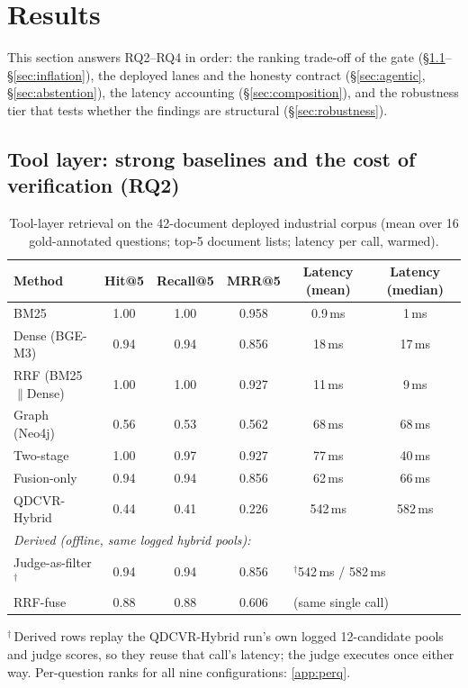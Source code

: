 \section{Results}
\label{sec:results}

This section answers RQ2--RQ4 in order: the ranking trade-off of the gate
(\S\ref{sec:retrieval}--\S\ref{sec:inflation}), the deployed lanes and the
honesty contract (\S\ref{sec:agentic}, \S\ref{sec:abstention}), the latency
accounting (\S\ref{sec:composition}), and the robustness tier that tests
whether the findings are structural (\S\ref{sec:robustness}).

\subsection{Tool layer: strong baselines and the cost of verification (RQ2)}
\label{sec:retrieval}

\begin{table}[!htbp]
\centering
\footnotesize
\setlength{\tabcolsep}{3pt}
\caption{Tool-layer retrieval on the 42-document deployed industrial corpus
(mean
over 16 gold-annotated questions; top-5 document lists; latency per call,
warmed).}
\label{tab:retrieval}
\begin{tabular}{lccccc}
\toprule
Method & Hit@5 & Recall@5 & MRR@5 & Latency (mean) & Latency (median) \\
\midrule
BM25                  & 1.00 & 1.00 & 0.958 & 0.9\,ms    & 1\,ms \\
Dense (BGE-M3)        & 0.94 & 0.94 & 0.856 & 18\,ms     & 17\,ms \\
RRF (BM25$\|$Dense)   & 1.00 & 1.00 & 0.927 & 11\,ms     & 9\,ms \\
Graph (Neo4j)         & 0.56 & 0.53 & 0.562 & 68\,ms     & 68\,ms \\
Two-stage             & 1.00 & 0.97 & 0.927 & 77\,ms     & 40\,ms \\
Fusion-only            & 0.94 & 0.94 & 0.856 & 62\,ms     & 66\,ms \\
QDCVR-Hybrid       & 0.44 & 0.41 & 0.226 & 542\,ms    & 582\,ms \\
\midrule
\multicolumn{6}{l}{\emph{Derived (offline, same logged hybrid pools):}}\\
\quad Judge-as-filter$^{\dagger}$ & 0.94 & 0.94 & 0.856 & \multicolumn{2}{l}{$^{\dagger}$542\,ms / 582\,ms} \\
\quad RRF-fuse & 0.88 & 0.88 & 0.606 & \multicolumn{2}{l}{(same single call)} \\
\bottomrule
\end{tabular}
\par\smallskip
\raggedright\footnotesize
$^{\dagger}$\,Derived rows replay the QDCVR-Hybrid run's own logged
12-candidate pools and judge scores, so they reuse that call's latency;
the judge executes once either way. Per-question ranks for all nine
configurations: \ref{app:perq}.
\end{table}

